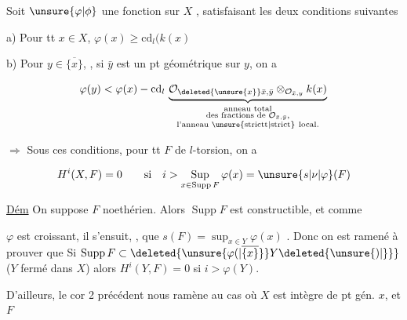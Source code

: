 
  Soit $\unsure{\varphi|\phi}$ une fonction sur $X$ , satisfaisant les deux conditions suivantes

a) Pour tt $x\in X$, $\varphi(x)\geq\mathrm{cd}_l(k(x)$

b) Pour $y\in\overline{\{x\}}$, , si $\bar y$ est un pt géométrique sur $y$, on a

\[
\varphi(y)<\varphi(x)-\mathrm{cd}_l\,
\underbrace{\mathcal O_{\deleted{\unsure{x}}\bar x,\bar y}\otimes_{\mathcal O_{\bar x,y}}k(x)}_
{\substack{\text{anneau total}\\\text{des fractions de }\mathcal O_{\bar x,\bar y},\\\text{l'anneau }\text{\unsure{strictt|strict}}\ \text{local}.}}
\]


$\Rightarrow$ Sous ces conditions, pour tt $F$ de $l$-torsion, on a

\[
H^i(X,F)=0\qquad\text{si}\quad i>\operatorname*{Sup}_{x\in\operatorname{Supp} F}\varphi(x)=\unsure{s|\nu|\varphi}(F)
\]

\uline{Dém}   On  suppose $F$ noethérien. Alors  $\operatorname{Supp}F$ est constructible, et comme

$\varphi$ est   croissant, il s'ensuit,  ,  que $s(F)=\sup_{x\in Y}\varphi(x)$  . Donc on est ramené  à prouver que Si $\operatorname{Supp}F\subset\deleted{\unsure{\varphi(|\overline{\{x\}}}}Y\deleted{\unsure{)|\}}}$ ($Y$ fermé dans $X$) alors $H^i(Y,F)=0$ si $i>\varphi(Y)$.


D'ailleurs, le cor 2 précédent nous ramène au cas où $X$ est intègre  de pt gén. $x$, et $F$

